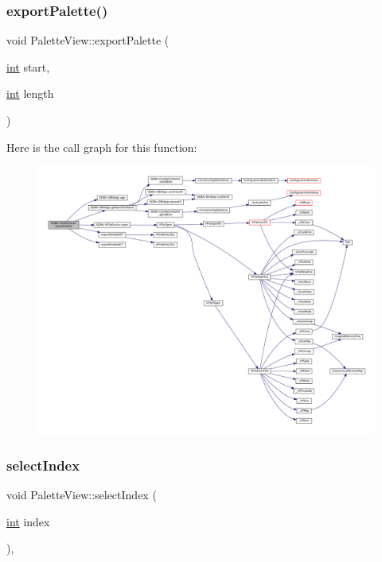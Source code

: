 \subsubsection{\texorpdfstring{export\+Palette()}{exportPalette()}}
{\footnotesize\ttfamily void Palette\+View\+::export\+Palette (\begin{DoxyParamCaption}\item[{\mbox{\hyperlink{ioapi_8h_a787fa3cf048117ba7123753c1e74fcd6}{int}}}]{start,  }\item[{\mbox{\hyperlink{ioapi_8h_a787fa3cf048117ba7123753c1e74fcd6}{int}}}]{length }\end{DoxyParamCaption})\hspace{0.3cm}{\ttfamily [private]}}

Here is the call graph for this function\+:
\nopagebreak
\begin{figure}[H]
\begin{center}
\leavevmode
\includegraphics[width=350pt]{class_q_g_b_a_1_1_palette_view_abcbc4ec67cdb645a624f559379c86d37_cgraph}
\end{center}
\end{figure}
\mbox{\label{class_q_g_b_a_1_1_palette_view_a80f9e5cbfa2a94ab352b3890225cc04f}} 
\subsubsection{\texorpdfstring{select\+Index}{selectIndex}}
{\footnotesize\ttfamily void Palette\+View\+::select\+Index (\begin{DoxyParamCaption}\item[{\mbox{\hyperlink{ioapi_8h_a787fa3cf048117ba7123753c1e74fcd6}{int}}}]{index }\end{DoxyParamCaption})\hspace{0.3cm}{\ttfamily [private]}, {\ttfamily [slot]}}

